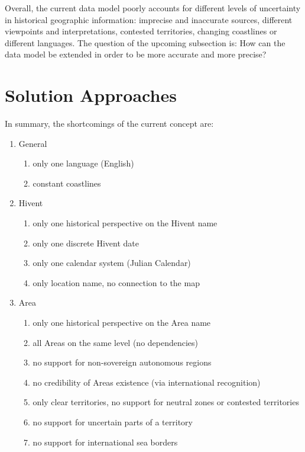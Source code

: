 Overall, the current data model poorly accounts for different levels of uncertainty in historical geographic information: imprecise and inaccurate sources, different viewpoints and interpretations, contested territories, changing coastlines or different languages. The question of the upcoming subsection is: How can the data model be extended in order to be more accurate and more precise?



\section{Solution Approaches} %
\label{sec:solution_approaches}

In summary, the shortcomings of the current concept are:

\begin{enumerate}
  \item General
  \begin{enumerate}
    \item only one language (English)
    \label{problem_general_multilang}
    \item constant coastlines
    \label{problem_general_coastlines}
  \end{enumerate}
  \item Hivent
  \begin{enumerate}
    \item only one historical perspective on the Hivent name
    \label{problem_hivent_perspective}
    \item only one discrete Hivent date
    \label{problem_hivent_dates}
    \item only one calendar system (Julian Calendar)
    \label{problem_hivent_calendar}
    \item only location name, no connection to the map
    \label{problem_hivent_location}
  \end{enumerate}
  \item Area
  \begin{enumerate}
    \item only one historical perspective on the Area name
    \label{problem_area_perspective}
    \item all Areas on the same level (no dependencies)
    \label{problem_area_levels}
    \item no support for non-sovereign autonomous regions
    \label{problem_area_autonomy}
    \item no credibility of Areas existence (via international recognition)
    \label{problem_area_recognition}
    \item only clear territories, no support for neutral zones or contested territories
    \label{problem_area_territory}
    \item no support for uncertain parts of a territory
    \label{problem_area_territory_certainty}
    \item no support for international sea borders
    \label{problem_area_territory_sea_borders}
  \end{enumerate}
\end{enumerate}

